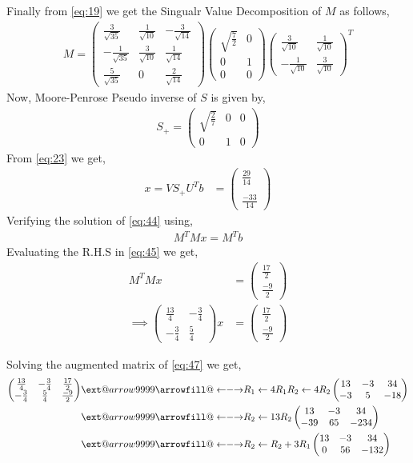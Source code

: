 \documentclass[journal,12pt,twocolumn]{IEEEtran}
\makeatletter
\newcommand\xleftrightarrow[2][]{%
  \ext@arrow 9999{\longleftrightarrowfill@}{#1}{#2}}
\newcommand\longleftrightarrowfill@{%
  \arrowfill@\leftarrow\relbar\rightarrow}
\newcommand{\myvec}[1]{\ensuremath{\begin{pmatrix}#1\end{pmatrix}}}
\makeatother
\begin{document}
Finally from \eqref{eq:19} we get the Singualr Value Decomposition of $M$ as follows,
\begin{align}
M =  \myvec{ \frac{3}{\sqrt{35}} & \frac{1}{\sqrt{10}}  &  -\frac{3}{\sqrt{14}}  \\  - \frac{1}{\sqrt{35}} & \frac{3}{\sqrt{10}}  &  \frac{1}{\sqrt{14}} \\ \frac{5}{\sqrt{35}} & 0  &  \frac{2}{\sqrt{14}} }\myvec{\sqrt{\frac{7}{2}}&0\\0&1\\0&0}\myvec{\frac{3}{\sqrt{10}}&\frac{1}{\sqrt{10}}\\ -\frac{1}{\sqrt{10}}&\frac{3}{\sqrt{10}}}^T
\end{align}
Now, Moore-Penrose Pseudo inverse of $S$ is given by,
\begin{align}
S_+ = \myvec{\sqrt{\frac{2}{7}}&0&0\\0&1&0}
\end{align}
From \eqref{eq:23} we get,
\begin{align}
x = VS_+U^Tb &= \myvec{\frac{29}{14}\\\\\frac{-33}{14}}\label{eq:44}
\end{align}
Verifying the solution of \eqref{eq:44} using,
\begin{align}
M^TMx = M^Tb\label{eq:45}
\end{align}
Evaluating the R.H.S in \eqref{eq:45} we get,
\begin{align}
M^TMx &= \myvec{\frac{17}{2}\\\frac{-9}{2}}\\
\implies\myvec{\frac{13}{4}& -\frac{3}{4}\\ -\frac{3}{4}&\frac{5}{4}}x &= \myvec{\frac{17}{2}\\\frac{-9}{2}}\label{eq:47}
\end{align}



Solving the augmented matrix of \eqref{eq:47} we get,
\begin{align}
\myvec{\frac{13}{4}&-\frac{3}{4}& \frac{17}{2} \\-\frac{3}{4}&\frac{5}{4}& \frac{-9}{2}} &\xleftrightarrow[R_1\leftarrow 4R_1]{R_2\leftarrow 4R_2}\myvec{13 & -3 & 34\\ -3 & 5 & -18}\\
&\xleftrightarrow{R_2\leftarrow 13R_2}\myvec{13 & -3 & 34 \\ -39 & 65 & -234}\\
&\xleftrightarrow{R_2 \leftarrow R_2+3R_1}\myvec{13 & -3 & 34 \\ 0 & 56 & -132}
\end{align}
\end{document}
